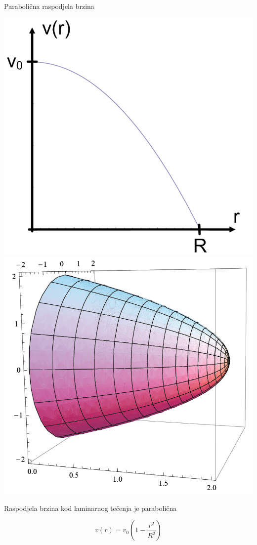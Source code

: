 \documentclass[croatian]{beamer}
\begin{document}
\begin{frame}{Parabolična raspodjela brzina}

\begin{center}
\includegraphics[height=0.4\paperheight]{slike/parabola1.PNG}\qquad{}
\includegraphics[height=0.4\paperheight]{slike/parabola2.PNG}
\par\end{center}
\begin{alertblock}{Raspodjela brzina kod laminarnog tečenja je parabolična}

\[
v(r)=v_{0}\left(1-\frac{r^{2}}{R^{2}}\right)
\]
\end{alertblock}
\end{frame}
\end{document}
